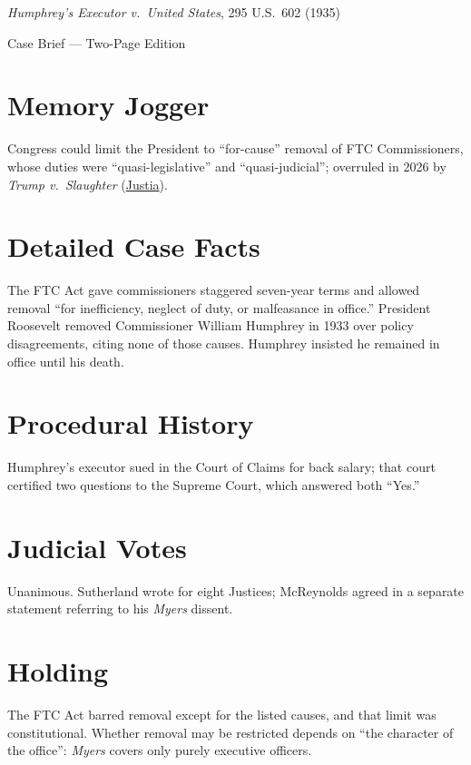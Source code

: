 \documentclass[12pt]{article}
\begin{document}
\begin{center}
{\LARGE \textit{Humphrey's Executor v.\ United States}, 295 U.S.\ 602 (1935)\par}
\vspace{0.5em}
{\large Case Brief --- Two-Page Edition\par}
\end{center}

\section{Memory Jogger}
Congress could limit the President to ``for-cause'' removal of FTC Commissioners, whose duties were ``quasi-legislative'' and ``quasi-judicial''; overruled in 2026 by \textit{Trump v.\ Slaughter} (\href{https://supreme.justia.com/cases/federal/us/295/602/}{Justia}).

\section{Detailed Case Facts}
The FTC Act gave commissioners staggered seven-year terms and allowed removal ``for inefficiency, neglect of duty, or malfeasance in office.'' President Roosevelt removed Commissioner William Humphrey in 1933 over policy disagreements, citing none of those causes. Humphrey insisted he remained in office until his death.

\section{Procedural History}
Humphrey's executor sued in the Court of Claims for back salary; that court certified two questions to the Supreme Court, which answered both ``Yes.''

\section{Judicial Votes}
Unanimous. Sutherland wrote for eight Justices; McReynolds agreed in a separate statement referring to his \textit{Myers} dissent.

\section{Holding}
The FTC Act barred removal except for the listed causes, and that limit was constitutional. Whether removal may be restricted depends on ``the character of the office'': \textit{Myers} covers only purely executive officers.
\end{document}
